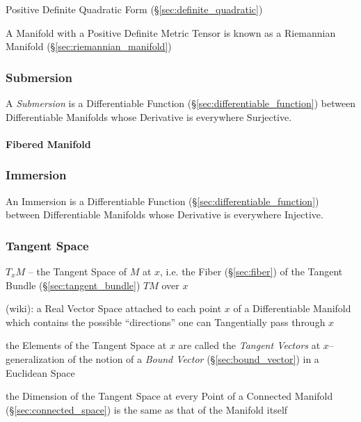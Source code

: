 Positive Definite Quadratic Form (\S\ref{sec:definite_quadratic})

A Manifold with a Positive Definite Metric Tensor is known as a
Riemannian Manifold (\S\ref{sec:riemannian_manifold})



\subsubsection{Submersion}\label{sec:submersion}

A \emph{Submersion} is a Differentiable Function
(\S\ref{sec:differentiable_function}) between Differentiable Manifolds
whose Derivative is everywhere Surjective.



\paragraph{Fibered Manifold}\label{sec:fibered_manifold}\hfill



\subsubsection{Immersion}\label{sec:immersion}

An Immersion is a Differentiable Function
(\S\ref{sec:differentiable_function}) between Differentiable Manifolds
whose Derivative is everywhere Injective.



\subsubsection{Tangent Space}\label{sec:tangent_space}

$T_x M$ -- the Tangent Space of $M$ at $x$, i.e. the Fiber (\S\ref{sec:fiber})
of the Tangent Bundle (\S\ref{sec:tangent_bundle}) $T M$ over $x$

(wiki): a Real Vector Space attached to each point $x$ of a Differentiable
Manifold which contains the possible ``directions'' one can Tangentially pass
through $x$

the Elements of the Tangent Space at $x$ are called the \emph{Tangent Vectors}
at $x$-- generalization of the notion of a \emph{Bound Vector}
(\S\ref{sec:bound_vector}) in a Euclidean Space

the Dimension of the Tangent Space at every Point of a Connected Manifold
(\S\ref{sec:connected_space}) is the same as that of the Manifold itself


